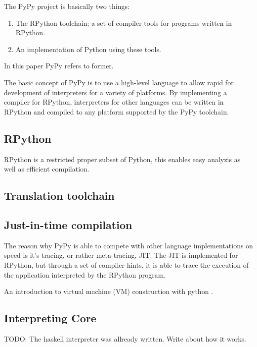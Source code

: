 The PyPy project is basically two things:

\begin{enumerate}

\item The RPython toolchain; a set of compiler tools for programs written in 
RPython.

\item An implementation of Python using these tools.

\end{enumerate}

In this paper PyPy refers to former.

The basic concept of PyPy is to use a high-level language to allow rapid for
development of interpreters for a variety of platforms. By implementing a compiler
for RPython, interpreters for other languages can be written in RPython and 
compiled to any platform supported by the PyPy toolchain.

\subsection{RPython}

RPython is a restricted proper subset of Python, this enables easy analyzis 
as well as efficient compilation.

\subsection{Translation toolchain}


\subsection{Just-in-time compilation}

The reason why PyPy is able to compete with other language implementations
on speed is it's tracing, or rather meta-tracing, JIT. The JIT is implemented
for RPython, but through a set of compiler hints, it is able to trace the 
execution of the application interpreted by the RPython program.

An introduction to virtual machine (VM) construction with python \cite{pypy}.


\subsection{Interpreting Core}

TODO: The haskell interpreter was allready written. Write about how it works.

